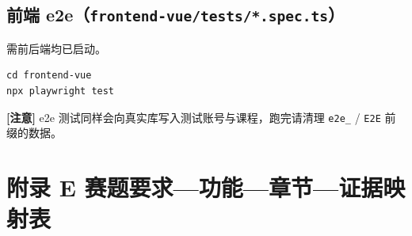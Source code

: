\documentclass[UTF8,a4paper,11pt]{ctexrep}
\newcommand{\warnmark}{\textcolor{todobar}{\textbf{[注意]}}}
\begin{document}
\subsection*{前端 e2e（\texttt{frontend-vue/tests/*.spec.ts}）}

需前后端均已启动。

\begin{Verbatim}[breaklines=true,breakanywhere=true,fontsize=\small,frame=single,framesep=4pt,rulecolor=\color{codeframe}]
cd frontend-vue
npx playwright test
\end{Verbatim}

\begin{todobox}
\warnmark{} e2e 测试同样会向真实库写入测试账号与课程，跑完请清理 \texttt{e2e\_} / \texttt{E2E} 前缀的数据。

\end{todobox}


\section*{附录 E 赛题要求—功能—章节—证据映射表}
\end{document}

